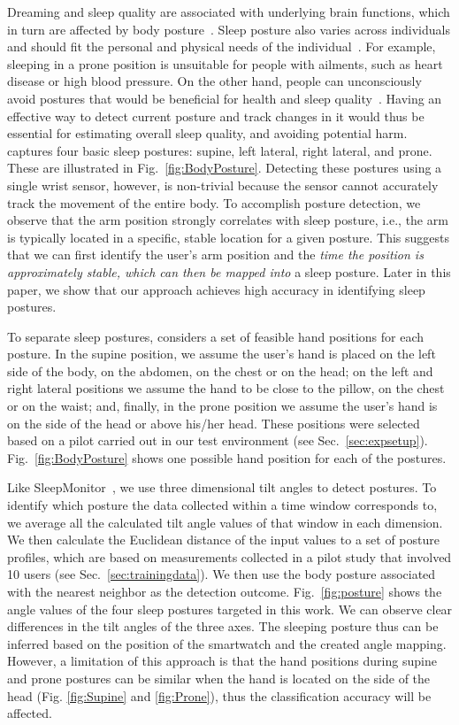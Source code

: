 Dreaming and sleep quality are associated with underlying brain functions, which in turn are affected by body posture~\cite{posture2004}.
Sleep posture also varies across individuals and should fit the personal and physical needs of the individual~\cite{posture2016,posture2017}.
For example, sleeping in a prone position is unsuitable for people with ailments, such as heart disease or high blood pressure. On the
other hand, people can {unconsciously} avoid postures that would be beneficial for health and sleep quality~\cite{posture2015}. Having an
effective way to detect current posture and track changes in it would thus be essential for estimating overall sleep quality, and avoiding
potential harm. {{\systemname} captures four basic sleep postures: supine, left lateral, right lateral, and prone. These are illustrated
in} Fig.~\ref{fig:BodyPosture}. Detecting these postures using a single wrist sensor, however, is non-trivial because the sensor cannot
accurately track the movement of the entire body. To accomplish posture detection, we observe that the arm position strongly correlates {with}
sleep posture, i.e., the arm is typically located in a specific, stable location for a given posture. This suggests that we can first
identify the user's arm position and the {\em time the position is approximately stable, which can then be mapped into} a sleep posture.
Later in this paper, we show that our approach {achieves} high accuracy in identifying sleep postures.

To separate sleep postures, {\systemname} considers a set of feasible hand positions for each posture. {In the supine position, we assume
the user's hand is placed on the left side of the body, on the abdomen, on the chest or on the head; on the left and right lateral
positions we assume the hand to be close to the pillow, on the chest or on the waist; and, finally, in the prone position we assume the
user's hand is on the side of the head or above his/her head.} These positions were selected based on a pilot carried out in our test
environment (see Sec.~\ref{sec:expsetup}). Fig.~\ref{fig:BodyPosture} shows one possible hand position for each of the postures.

Like SleepMonitor~\cite{sleepmonitor}, we use {three dimensional tilt angles} to detect postures. To identify {which posture the data
collected within a time window corresponds to}, we average all the calculated tilt angle values of that window in each dimension. We then
calculate the Euclidean distance of the input values to a set of posture profiles, which are based on measurements collected in a pilot
study that involved 10 users (see Sec.~\ref{sec:trainingdata}). We then use the body posture associated with the nearest neighbor as the
detection outcome. Fig.~\ref{fig:posture} shows the angle values of the four sleep postures targeted in this work. {We can observe clear
differences in the tilt angles of the three axes}. The sleeping posture thus can be inferred based on the position of the smartwatch and the
created angle mapping. However, a limitation of this approach is that the hand positions during supine and prone postures {can be} similar
when the hand is located on the side of the head (Fig. \ref{fig:Supine} and \ref{fig:Prone}), thus the classification accuracy will be
affected.

